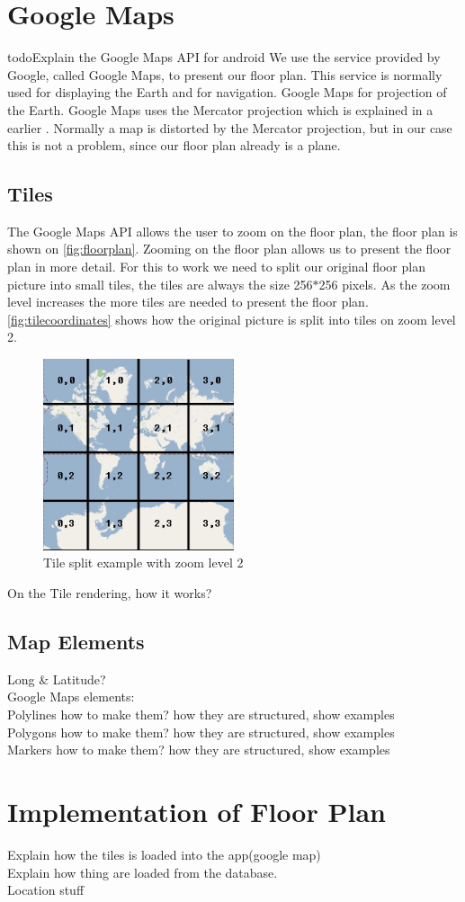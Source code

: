 \section{Google Maps}
todo{Explain the Google Maps API for android}
We use the service provided by Google, called Google Maps, to present our floor plan. This service is normally used for displaying the Earth and for navigation. Google Maps for projection of the Earth. Google Maps uses the Mercator projection which is explained in a earlier . Normally a map is distorted by the Mercator projection, but in our case this is not a problem, since our floor plan already is a plane. 
\subsection*{Tiles}
The Google Maps API allows the user to zoom on the floor plan, the floor plan is shown on \autoref{fig:floorplan}. Zooming on the floor plan allows us to present the floor plan in more detail. For this to work we need to split our original floor plan picture into small tiles, the tiles are always the size 256$*$256 pixels. As the zoom level increases the more tiles are needed to present the floor plan. \autoref{fig:tilecoordinates} shows how the original picture is split into tiles on zoom level 2.
\begin{figure}[H]
\centering
\includegraphics[width=0.5\textwidth]{img/tilecoordinates.png}
\caption{Tile split example with zoom level 2 \citep{tilecoordinates}}
\label{fig:tilecoordinates}
\end{figure} On the
Tile rendering, how it works?\\
\subsection*{Map Elements}
Long \& Latitude?\\
Google Maps elements:\\
Polylines how to make them? how they are structured, show examples\\
Polygons how to make them? how they are structured, show examples\\
Markers how to make them? how they are structured, show examples\\

\section*{Implementation of Floor Plan} 
Explain how the tiles is loaded into the app(google map)\\
Explain how thing are loaded from the database.\\
Location stuff
	
